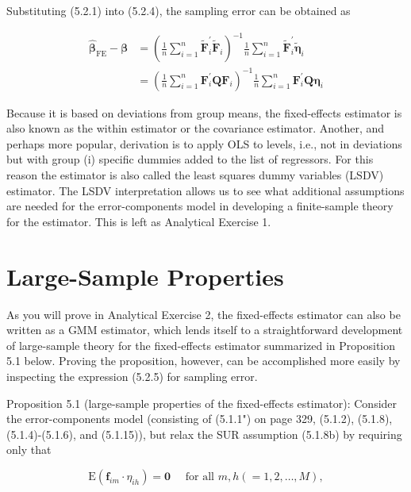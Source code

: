 \documentclass[10pt]{article}
\begin{document}
Substituting (5.2.1) into (5.2.4), the sampling error can be obtained as


\begin{align*}
\widehat{\boldsymbol{\beta}}_{\mathrm{FE}}-\boldsymbol{\beta} & =\left(\frac{1}{n} \sum_{i=1}^{n} \widetilde{\mathbf{F}}_{i}^{\prime} \widetilde{\mathbf{F}}_{i}\right)^{-1} \frac{1}{n} \sum_{i=1}^{n} \widetilde{\mathbf{F}}_{i}^{\prime} \tilde{\boldsymbol{\eta}}_{i} \\
& =\left(\frac{1}{n} \sum_{i=1}^{n} \mathbf{F}_{i}^{\prime} \mathbf{Q} \mathbf{F}_{i}\right)^{-1} \frac{1}{n} \sum_{i=1}^{n} \mathbf{F}_{i}^{\prime} \mathbf{Q} \boldsymbol{\eta}_{i} \tag{5.2.5}
\end{align*}


Because it is based on deviations from group means, the fixed-effects estimator is also known as the within estimator or the covariance estimator. Another, and perhaps more popular, derivation is to apply OLS to levels, i.e., not in deviations but with group (i) specific dummies added to the list of regressors. For this reason the estimator is also called the least squares dummy variables (LSDV) estimator. The LSDV interpretation allows us to see what additional assumptions are needed for the error-components model in developing a finite-sample theory for the estimator. This is left as Analytical Exercise 1.

\section*{Large-Sample Properties}
As you will prove in Analytical Exercise 2, the fixed-effects estimator can also be written as a GMM estimator, which lends itself to a straightforward development of large-sample theory for the fixed-effects estimator summarized in Proposition 5.1 below. Proving the proposition, however, can be accomplished more easily by inspecting the expression (5.2.5) for sampling error.

Proposition 5.1 (large-sample properties of the fixed-effects estimator): Consider the error-components model (consisting of (5.1.1") on page 329, (5.1.2), (5.1.8), (5.1.4)-(5.1.6), and (5.1.15)), but relax the SUR assumption (5.1.8b) by requiring only that


\begin{equation*}
\mathrm{E}\left(\mathbf{f}_{i m} \cdot \eta_{i h}\right)=\mathbf{0} \quad \text { for all } m, h(=1,2, \ldots, M), \tag{5.2.6}
\end{equation*}
\end{document}
